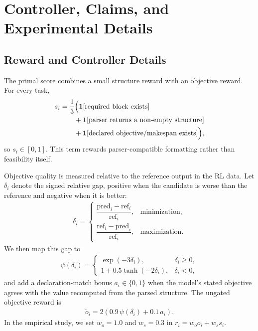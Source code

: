 \documentclass{article}
\theoremstyle{remark}
\begin{document}
\section{Controller, Claims, and Experimental Details}
\label{app:controller}
\subsection{Reward and Controller Details}
The primal score combines a small structure reward with an objective reward. For every task,
\begin{align}
s_i
&= \frac{1}{3}\Bigl(
\mathbf{1}[\text{required block exists}] \notag\\
&\qquad + \mathbf{1}[\text{parser returns a non-empty structure}] \notag\\
&\qquad + \mathbf{1}[\text{declared objective/makespan exists}]
\Bigr),
\end{align}
so \(s_i \in [0,1]\). This term rewards parser-compatible formatting rather than feasibility itself.

Objective quality is measured relative to the reference output in the RL data. Let \(\delta_i\) denote the signed relative gap, positive when the candidate is worse than the reference and negative when it is better:
\begin{align}
\delta_i =
\begin{cases}
\dfrac{\mathrm{pred}_i - \mathrm{ref}_i}{\mathrm{ref}_i}, & \text{minimization}, \\
\dfrac{\mathrm{ref}_i - \mathrm{pred}_i}{\mathrm{ref}_i}, & \text{maximization}.
\end{cases}
\end{align}
We then map this gap to
\begin{align}
\psi(\delta_i) =
\begin{cases}
\exp(-3 \delta_i), & \delta_i \ge 0, \\
1 + 0.5 \tanh(-2 \delta_i), & \delta_i < 0,
\end{cases}
\end{align}
and add a declaration-match bonus \(a_i \in \{0,1\}\) when the model's stated objective agrees with the value recomputed from the parsed structure. The ungated objective reward is
\begin{align}
\tilde{o}_i = 2 \left(0.9\, \psi(\delta_i) + 0.1\, a_i \right).
\end{align}
In the empirical study, we set \(w_o=1.0\) and \(w_s=0.3\) in \(r_i=w_o o_i+w_s s_i\).
\end{document}
